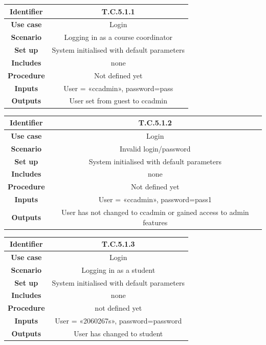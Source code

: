 \documentclass{l3deliverable}
\begin{document}
\begin{tabular}{|c|c|}
\hline \textbf{Identifier} & T.C.5.1.1\\
\hline \textbf{Use case} & Login \\
\hline \textbf{Scenario} & Logging in as a course coordinator \\
\hline \textbf{Set up} & System initialised with default parameters\\
\hline \textbf{Includes} & none\\
\hline \textbf{Procedure} & Not defined yet\\
\hline \textbf{Inputs} & User = «ccadmin», password=pass\\
\hline \textbf{Outputs} & User set from guest to ccadmin \\
\hline
\end{tabular}

\begin{tabular}{|c|c|}
\hline \textbf{Identifier} & T.C.5.1.2 \\
\hline \textbf{Use case} & Login\\
\hline \textbf{Scenario} & Invalid login/password\\
\hline \textbf{Set up} & System initialised with default parameters\\
\hline \textbf{Includes} & none\\
\hline \textbf{Procedure} & Not defined yet\\
\hline \textbf{Inputs} & User = «ccadmin», password=pass1\\
\hline \textbf{Outputs} & User has not changed to ccadmin or gained
access to admin features \\
\hline
\end{tabular}

\begin{tabular}{|c|c|}
\hline \textbf{Identifier} & T.C.5.1.3\\
\hline \textbf{Use case} & Login \\
\hline \textbf{Scenario} & Logging in as a student\\
\hline \textbf{Set up} & System initialised with default parameters\\
\hline \textbf{Includes} & none\\
\hline \textbf{Procedure} & not defined yet\\
\hline \textbf{Inputs} & User = «2060267s», password=password\\
\hline \textbf{Outputs} & User has changed to student\\
\hline
\end{tabular}
\end{document}
